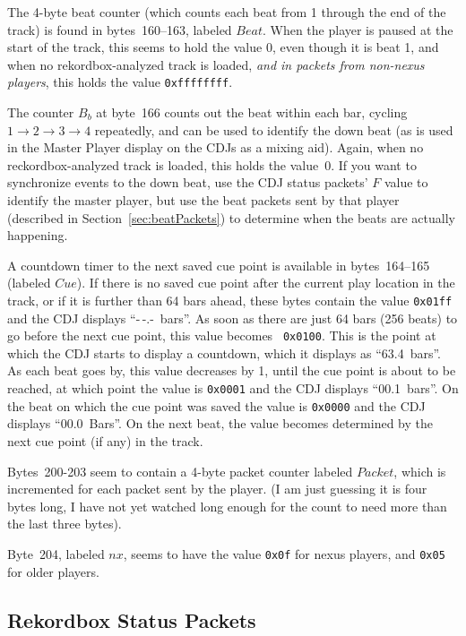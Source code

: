 \documentclass[11pt]{article}
\begin{document}
The 4-byte beat counter (which counts each beat from 1 through the end
of the track) is found in bytes~160--163, labeled $Beat$. When the
player is paused at the start of the track, this seems to hold the
value 0, even though it is beat 1, and when no rekordbox-analyzed
track is loaded, \emph{and in packets from non-nexus players}, this
holds the value {\tt 0xffffffff}.

The counter $B_b$ at byte~166 counts out the beat within each bar,
cycling $1\to2\to3\to4$ repeatedly, and can be used to identify the
down beat (as is used in the Master Player display on the CDJs as a
mixing aid). Again, when no reckordbox-analyzed track is loaded, this
holds the value~0. If you want to synchronize events to the down beat,
use the CDJ status packets' $F$ value to identify the master player,
but use the beat packets sent by that player (described in
Section~\ref{sec:beatPackets}) to determine when the beats are
actually happening.

A countdown timer to the next saved cue point is available in
bytes~164--165 (labeled $Cue$). If there is no saved cue point after
the current play location in the track, or if it is further than 64
bars ahead, these bytes contain the value {\tt 0x01ff} and the CDJ
displays ``-\,-.-~bars''. As soon as there are just 64 bars (256
beats) to go before the next cue point, this value becomes {\tt
  0x0100}. This is the point at which the CDJ starts to display a
countdown, which it displays as ``63.4~bars''. As each beat goes by,
this value decreases by 1, until the cue point is about to be reached,
at which point the value is {\tt 0x0001} and the CDJ displays
``00.1~bars''. On the beat on which the cue point was saved the value
is {\tt 0x0000} and the CDJ displays ``00.0~Bars''. On the next beat,
the value becomes determined by the next cue point (if any) in the
track.

Bytes~200-203 seem to contain a 4-byte packet counter labeled
$Packet$, which is incremented for each packet sent by the player. (I
am just guessing it is four bytes long, I have not yet watched long
enough for the count to need more than the last three bytes).

Byte~204, labeled $nx$, seems to have the value {\tt 0x0f} for nexus
players, and {\tt 0x05} for older players.

\subsection{Rekordbox Status Packets}
\end{document}
